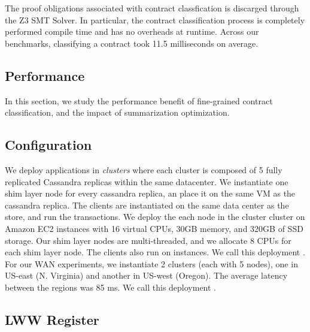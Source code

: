 The proof obligations associated with contract classfication is discarged
through the Z3 SMT Solver. In particular, the contract classification process
is completely performed compile time and has no overheads at runtime. Across
our benchmarks, classifying a contract took 11.5 milliseconds on average.

\subsection{Performance}

In this section, we study the performance benefit of fine-grained contract
classification, and the impact of summarization optimization.

\subsection{Configuration}

We deploy \name applications in \emph{clusters} where each cluster is composed
of 5 fully replicated Cassandra replicas within the same datacenter. We
instantiate one shim layer node for every cassandra replica, an place it on the
same VM as the cassandra replica. The clients are instantiated on the same data
center as the store, and run the transactions. We deploy the each node in the
cluster cluster on  Amazon EC2 instances with 16 virtual CPUs,
30GB memory, and 320GB of SSD storage. Our shim layer nodes are multi-threaded,
and we allocate 8 CPUs for each shim layer node. The clients also run on
 instances. We call this deployment . For our WAN
experiments, we instantiate 2 clusters (each with 5 nodes), one in US-east (N.
Virginia) and another in US-west (Oregon). The average latency between the
regions was 85 ms. We call this deployment .

\subsection{LWW Register}

